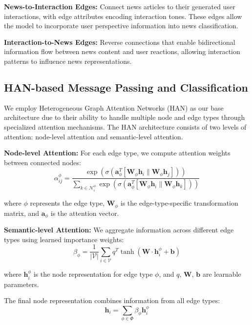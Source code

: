 \textbf{News-to-Interaction Edges:} Connect news articles to their generated user interactions, with edge attributes encoding interaction tones. These edges allow the model to incorporate user perspective information into news classification.

\textbf{Interaction-to-News Edges:} Reverse connections that enable bidirectional information flow between news content and user reactions, allowing interaction patterns to influence news representations.

\subsection{HAN-based Message Passing and Classification}

We employ Heterogeneous Graph Attention Networks (HAN) as our base architecture due to their ability to handle multiple node and edge types through specialized attention mechanisms. The HAN architecture consists of two levels of attention: node-level attention and semantic-level attention.

\textbf{Node-level Attention:} For each edge type, we compute attention weights between connected nodes:
\begin{equation}
\alpha_{ij}^{\phi} = \frac{\exp(\sigma(\mathbf{a}_{\phi}^T[\mathbf{W}_{\phi}\mathbf{h}_i \| \mathbf{W}_{\phi}\mathbf{h}_j]))}{\sum_{k \in \mathcal{N}_i^{\phi}} \exp(\sigma(\mathbf{a}_{\phi}^T[\mathbf{W}_{\phi}\mathbf{h}_i \| \mathbf{W}_{\phi}\mathbf{h}_k]))}
\end{equation}

where $\phi$ represents the edge type, $\mathbf{W}_{\phi}$ is the edge-type-specific transformation matrix, and $\mathbf{a}_{\phi}$ is the attention vector.

\textbf{Semantic-level Attention:} We aggregate information across different edge types using learned importance weights:
\begin{equation}
\beta_{\phi} = \frac{1}{|\mathcal{V}|} \sum_{i \in \mathcal{V}} q^T \tanh(\mathbf{W} \cdot \mathbf{h}_i^{\phi} + \mathbf{b})
\end{equation}

where $\mathbf{h}_i^{\phi}$ is the node representation for edge type $\phi$, and $q$, $\mathbf{W}$, $\mathbf{b}$ are learnable parameters.

The final node representation combines information from all edge types:
\begin{equation}
\mathbf{h}_i = \sum_{\phi \in \Phi} \beta_{\phi} \mathbf{h}_i^{\phi}
\end{equation}

